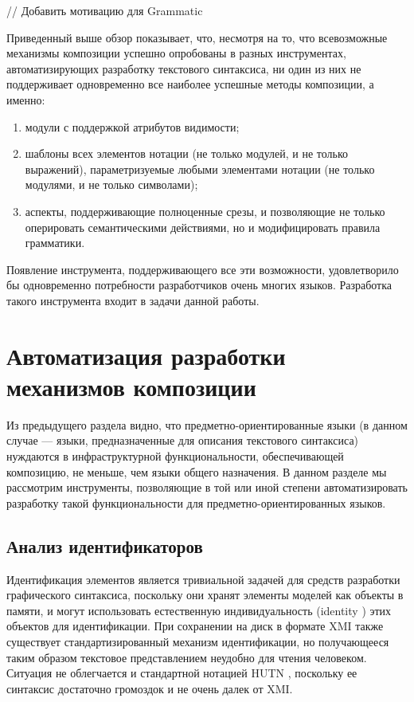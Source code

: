 // Добавить мотивацию для Grammatic

Приведенный выше обзор показывает, что, несмотря на то, что всевозможные механизмы композиции успешно опробованы в разных инструментах, автоматизирующих разработку текстового синтаксиса, ни один из них не поддерживает одновременно все наиболее успешные методы композиции, а именно:
\begin{enumerate}
\item модули с поддержкой атрибутов видимости;
\item шаблоны всех элементов нотации (не только модулей, и не только выражений), параметризуемые любыми элементами нотации (не только модулями, и не только символами);
\item аспекты, поддерживающие полноценные срезы, и позволяющие не только оперировать семантическими действиями, но и модифицировать правила грамматики.
\end{enumerate}

Появление инструмента, поддерживающего все эти возможности, удовлетворило бы одновременно потребности разработчиков очень многих языков. Разработка такого инструмента входит в задачи данной работы.
	
\chapter{Автоматизация разработки механизмов композиции}

Из предыдущего раздела видно, что предметно-ориентированные языки (в данном случае --- языки, предназначенные для описания текстового синтаксиса) нуждаются в инфраструктурной функциональности, обеспечивающей композицию, не меньше, чем языки общего назначения. В данном разделе мы рассмотрим инструменты, позволяющие в той или иной степени автоматизировать разработку такой функциональности для предметно-ориентированных языков.

\section{Анализ идентификаторов}

Идентификация элементов является тривиальной задачей для средств разработки графического синтаксиса, поскольку они хранят элементы моделей как объекты в памяти, и могут использовать естественную индивидуальность (identity \cite{???}) этих объектов для идентификации. При сохранении на диск в формате XMI \cite{???} также существует стандартизированный механизм идентификации, но получающееся таким образом текстовое представлением неудобно для чтения человеком. Ситуация не облегчается и стандартной нотацией HUTN \cite{???}, поскольку ее синтаксис достаточно громоздок и не очень далек от XMI.

